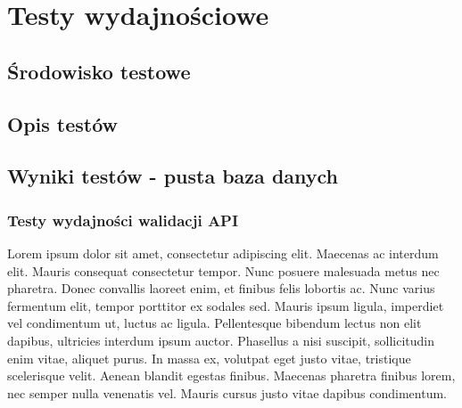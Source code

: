 \chapter{Testy wydajnościowe}
\section{Środowisko testowe}
\section{Opis testów}
\section{Wyniki testów - pusta baza danych}

\newpage
\subsection{Testy wydajności walidacji API}

\clearpage
Lorem ipsum dolor sit amet, consectetur adipiscing elit. Maecenas ac interdum elit. Mauris consequat consectetur tempor. Nunc posuere malesuada metus nec pharetra. Donec convallis laoreet enim, et finibus felis lobortis ac. Nunc varius fermentum elit, tempor porttitor ex sodales sed. Mauris ipsum ligula, imperdiet vel condimentum ut, luctus ac ligula. Pellentesque bibendum lectus non elit dapibus, ultricies interdum ipsum auctor. Phasellus a nisi suscipit, sollicitudin enim vitae, aliquet purus. In massa ex, volutpat eget justo vitae, tristique scelerisque velit. Aenean blandit egestas finibus. Maecenas pharetra finibus lorem, nec semper nulla venenatis vel. Mauris cursus justo vitae dapibus condimentum.


% 

% 

% 

